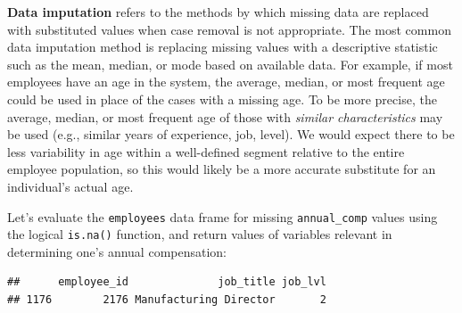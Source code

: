 \documentclass[
]{book}
\newenvironment{Shaded}{\begin{snugshade}}{\end{snugshade}}
\newcommand{\AttributeTok}[1]{\textcolor[rgb]{0.77,0.63,0.00}{#1}}
\newcommand{\CommentTok}[1]{\textcolor[rgb]{0.56,0.35,0.01}{\textit{#1}}}
\newcommand{\ConstantTok}[1]{\textcolor[rgb]{0.00,0.00,0.00}{#1}}
\newcommand{\FunctionTok}[1]{\textcolor[rgb]{0.00,0.00,0.00}{#1}}
\newcommand{\NormalTok}[1]{#1}
\newcommand{\OtherTok}[1]{\textcolor[rgb]{0.56,0.35,0.01}{#1}}
\newcommand{\SpecialCharTok}[1]{\textcolor[rgb]{0.00,0.00,0.00}{#1}}
\newcommand{\StringTok}[1]{\textcolor[rgb]{0.31,0.60,0.02}{#1}}
\begin{document}
\textbf{Data imputation} refers to the methods by which missing data are replaced with substituted values when case removal is not appropriate. The most common data imputation method is replacing missing values with a descriptive statistic such as the mean, median, or mode based on available data. For example, if most employees have an age in the system, the average, median, or most frequent age could be used in place of the cases with a missing age. To be more precise, the average, median, or most frequent age of those with \emph{similar characteristics} may be used (e.g., similar years of experience, job, level). We would expect there to be less variability in age within a well-defined segment relative to the entire employee population, so this would likely be a more accurate substitute for an individual's actual age.

Let's evaluate the \texttt{employees} data frame for missing \texttt{annual\_comp} values using the logical \texttt{is.na()} function, and return values of variables relevant in determining one's annual compensation:

\begin{Shaded}
\end{Shaded}

\begin{verbatim}
##      employee_id              job_title job_lvl
## 1176        2176 Manufacturing Director       2
\end{verbatim}
\end{document}
